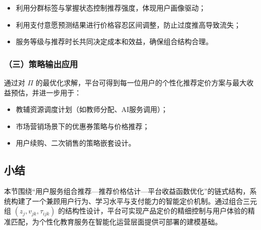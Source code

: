 \begin{itemize}
\item 利用分群标签与掌握状态控制推荐强度，体现用户画像驱动；
\item 利用支付意愿预测结果进行价格容忍区间调整，防止过度推高导致流失；
\item 服务等级与推荐时长共同决定成本和效益，确保组合结构合理。
\end{itemize}

\subsubsection*{（三）策略输出应用}

通过对 $\Pi$ 的最优化求解，平台可得到每一位用户的个性化推荐定价方案与最大收益预估，并进一步用于：

\begin{itemize}
\item 教辅资源调度计划（如教师分配、AI服务调用）；
\item 市场营销场景下的优惠券策略与价格推荐；
\item 用户续购、二次销售的策略嵌套设计。
\end{itemize}

\subsection*{小结}

本节围绕“用户服务组合推荐—推荐价格估计—平台收益函数优化”的链式结构，系统构建了一个兼顾用户行为、学习水平与支付能力的智能定价机制。通过组合三元组 $(z_j, v_{jk}, \tau_{ijk})$ 的结构性设计，平台可实现产品定价的精细控制与用户体验的精准匹配，为个性化教育服务在智能化运营层面提供可部署的建模基础。







